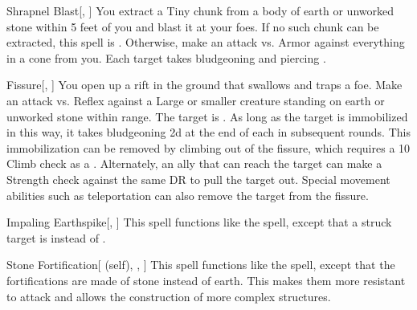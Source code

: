 \lowercase{\hypertarget{spell:Shrapnel Blast}{}}\label{spell:Shrapnel Blast}
\begin{freeability}[\nth{3}]{\hypertarget{spell:Shrapnel Blast}{Shrapnel Blast}}[, ]
You extract a Tiny chunk from a body of earth or unworked stone within 5 feet of you and blast it at your foes.
If no such chunk can be extracted, this spell is .
Otherwise, make an attack vs. Armor against everything in a \arealarge cone from you.
\hit Each target takes bludgeoning and piercing .
\end{freeability}
\vspace{0.25em}



\lowercase{\hypertarget{spell:Fissure}{}}\label{spell:Fissure}
\begin{freeability}[\nth{4}]{\hypertarget{spell:Fissure}{Fissure}}[, ]
You open up a rift in the ground that swallows and traps a foe.
Make an attack vs. Reflex against a Large or smaller creature standing on earth or unworked stone within \rngmed range.
\hit The target is .
As long as the target is immobilized in this way,
it takes bludgeoning  \minus2d at the end of each  in subsequent rounds.
This immobilization can be removed by climbing out of the fissure, which requires a  10 Climb check as a .
Alternately, an ally that can reach the target can make a Strength check against the same DR to pull the target out.
Special movement abilities such as teleportation can also remove the target from the fissure.
\end{freeability}
\vspace{0.25em}



\lowercase{\hypertarget{spell:Impaling Earthspike}{}}\label{spell:Impaling Earthspike}
\begin{freeability}[\nth{4}]{\hypertarget{spell:Impaling Earthspike}{Impaling Earthspike}}[, ]
This spell functions like the  spell, except that a struck target is  instead of .
\end{freeability}
\vspace{0.25em}



\lowercase{\hypertarget{spell:Stone Fortification}{}}\label{spell:Stone Fortification}
\begin{attuneability}[\nth{4}]{\hypertarget{spell:Stone Fortification}{Stone Fortification}}[ (self), , ]
This spell functions like the  spell, except that the fortifications are made of stone instead of earth.
This makes them more resistant to attack and allows the construction of more complex structures.
\end{attuneability}
\vspace{0.25em}



